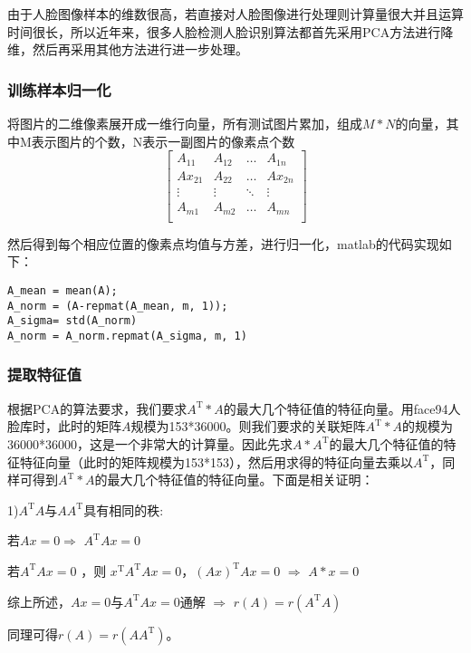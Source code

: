\documentclass[a4paper,12pt]{ctexart}
\begin{document}
由于人脸图像样本的维数很高，若直接对人脸图像进行处理则计算量很大并且运算时间很长，所以近年来，很多人脸检测人脸识别算法都首先采用PCA方法进行降维，然后再采用其他方法进行进一步处理。

\subsubsection{训练样本归一化}

将图片的二维像素展开成一维行向量，所有测试图片累加，组成$M*N$的向量，其中M表示图片的个数，N表示一副图片的像素点个数
\[
\begin{bmatrix}
A_{11} & A_{12} & \ldots & A_{1n}\\
Ax_{21} & A_{22} & \ldots & Ax_{2n}\\
\vdots & \vdots & \ddots & \vdots\\
A_{m1} & A_{m2} & \ldots & A_{mn}\\
\end{bmatrix}
\]

然后得到每个相应位置的像素点均值与方差，进行归一化，matlab的代码实现如下：

\begin{lstlisting}
A_mean = mean(A);
A_norm = (A-repmat(A_mean, m, 1));
A_sigma= std(A_norm)
A_norm = A_norm.repmat(A_sigma, m, 1)
\end{lstlisting}

\subsubsection{提取特征值}

根据PCA的算法要求，我们要求$A^\mathrm{T}*A$的最大几个特征值的特征向量。用face94人脸库时，此时的矩阵$A$规模为153*36000。则我们要求的关联矩阵$A^\mathrm{T}*A$的规模为36000*36000，这是一个非常大的计算量。因此先求$A*A^\mathrm{T}$的最大几个特征值的特征特征向量（此时的矩阵规模为153*153），然后用求得的特征向量去乘以$A^\mathrm{T}$，同样可得到$A^\mathrm{T}*A$的最大几个特征值的特征向量。下面是相关证明：

1)$A^\mathrm{T}A$与$AA^\mathrm{T}$具有相同的秩:

若$Ax=0$\quad $\Longrightarrow$ \quad$A^\mathrm{T}Ax=0 $

若$A^\mathrm{T}Ax=0 $ ，则 $x^\mathrm{T}A^\mathrm{T}Ax=0 $，$(Ax)^\mathrm{T}Ax=0$ \quad $\Longrightarrow$ \quad $A*x=0$

综上所述，$Ax=0$与$A^\mathrm{T}Ax=0$通解 \quad $\Longrightarrow$ \quad $r(A)=r(A^\mathrm{T}A)$

同理可得$r(A)=r(AA^\mathrm{T})$。
\end{document}
